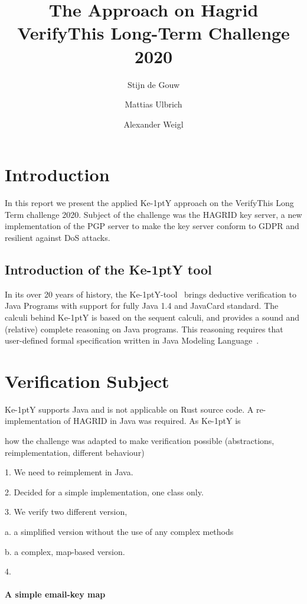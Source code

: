 \documentclass{llncs}
\title{The \KeY Approach on Hagrid
  \\{\small VerifyThis Long-Term Challenge 2020 }}
\author{ Stijn de Gouw \and Mattias Ulbrich \and Alexander Weigl }
\institute{Open University \and Karlsruhe Institute of Technology}
\newcommand{\KeY}{Ke\kern-1ptY\xspace}
\begin{document}
\maketitle

\section{Introduction}

In this report we present the applied \KeY approach on the VerifyThis Long Term
challenge 2020. Subject of the challenge was the HAGRID key server, a new
implementation of the PGP server to make the key server conform to
GDPR and resilient against DoS attacks.



\subsection{Introduction of the \KeY tool}

In its over 20 years of history, the \KeY-tool~\cite{KeyBook2} brings deductive
verification to Java Programs with support for fully Java 1.4 and JavaCard
 standard.
%
The calculi behind \KeY is based on the sequent calculi, and provides a sound
and (relative) complete reasoning on Java programs. This reasoning requires that
user-defined formal specification written in Java Modeling Language~\cite{Jml}.


\section{Verification Subject}

\KeY supports Java and is not applicable on Rust source code.
%
A re-implementation of HAGRID in Java was required.
%
As \KeY is

how the challenge was adapted to make verification possible
(abstractions, reimplementation, different behaviour)

1. We need to reimplement in Java.

2. Decided for a simple implementation, one class only.

3. We verify two different version,

a. a simplified version without the use of any complex methods

b. a complex, map-based version.

4. 

\paragraph{A simple email-key map}
\end{document}
